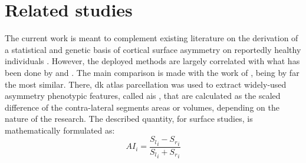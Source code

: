 \section{Related studies}
The current work is meant to complement existing literature on the derivation of a statistical and genetic basis of cortical surface asymmetry on reportedly healthy individuals \cite{Sha2021,Kong2018,Kong2021,Zhao2022}. However, the deployed methods are largely correlated with what has been done by \citet{Naqvi2021} and \citet{Claes2018}. The main comparison is made with the work of \citet{Sha2021}, being by far the most similar. There, \ac{dk} atlas parcellation was used to extract widely-used asymmetry phenotypic features, called \acfp{ai} \cite{Graham2022,Sarica2018,Kong2018,Savic2008,Zuo2019}, that are calculated as the scaled difference of the contra-lateral segments areas or volumes, depending on the nature of the research. The described quantity, for surface studies, is mathematically formulated as:
$$
AI_i = \frac{{S_l}_i-{S_r}_i}{{S_l}_i+{S_r}_i}
$$
